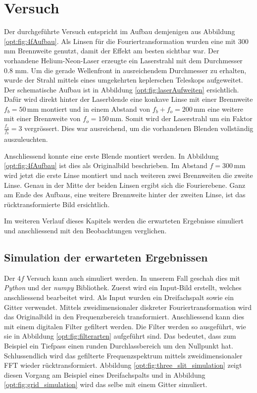 %
%
%
%
\section{Versuch
  \label{opt:section:versuch}}

Der durchgeführte Versuch entspricht im Aufbau demjenigen aus Abbildung \ref{opt:fig:4fAufbau}.
Als Linsen für die Fouriertransformation wurden eine mit 300 mm Brennweite genutzt, damit der Effekt am besten sichtbar war.
Der vorhandene Helium-Neon-Laser erzeugte ein Laserstrahl mit dem Durchmesser $0.8$ mm.
Um die gerade Wellenfront in ausreichendem Durchmesser zu erhalten, wurde der Strahl mittels eines umgekehrten keplerschen Teleskops aufgeweitet.
Der schematische Aufbau ist in Abbildung \ref{opt:fig:laserAufweiten} ersichtlich.
Dafür wird direkt hinter der Laserblende eine konkave Linse mit einer Brennweite $f_b = 50\,\text{mm}$ montiert 
und in einem Abstand von $f_b + f_o = 200\,\text{mm}$ eine weitere mit einer Brennweite von $f_o = 150\,\text{mm}$.
Somit wird der Laserstrahl um ein Faktor $\frac{f_o}{f_b} = 3$ vergrössert.
Dies war ausreichend, um die vorhandenen Blenden vollständig auszuleuchten.

Anschliessend konnte eine erste Blende montiert werden.
In Abbildung \ref{opt:fig:4fAufbau} ist dies als Originalbild beschrieben.
Im Abstand $f=300\,\text{mm}$ wird jetzt die erste Linse montiert und nach weiteren zwei Brennweiten die zweite Linse.
Genau in der Mitte der beiden Linsen ergibt sich die Fourierebene.
Ganz am Ende des Aufbaus, eine weitere Brennweite hinter der zweiten Linse, ist das rücktransformierte Bild ersichtlich.

Im weiteren Verlauf dieses Kapitels werden die erwarteten Ergebnisse simuliert und anschliessend mit den Beobachtungen verglichen.

\subsection{Simulation der erwarteten Ergebnissen}
Der $4f$ Versuch kann auch simuliert werden.
In unserem Fall geschah dies mit \emph{Python} und der \emph{numpy} Bibliothek.
Zuerst wird ein Input-Bild erstellt, welches anschliessend bearbeitet wird.
Als Input wurden ein Dreifachspalt sowie ein Gitter verwendet.
Mittels zweidimensionaler diskreter Fouriertransformation wird das Originalbild in den Frequenzbereich transformiert.
Anschliessend kann dies mit einem digitalen Filter gefiltert werden.
Die Filter werden so ausgeführt, wie sie in Abbildung \ref{opt:fig:filterarten} aufgeführt sind.
Das bedeutet, dass zum Beispiel ein Tiefpass einen runden Durchlassbereich um den Nullpunkt hat.
Schlussendlich wird das gefilterte Frequenzspektrum mittels zweidimensionaler FFT wieder rücktransformiert.
Abbildung \ref{opt:fig:three_slit_simulation} zeigt diesen Vorgang am Beispiel eines Dreifachspalts und 
in Abbildung \ref{opt:fig:grid_simulation} wird das selbe mit einem Gitter simuliert.

